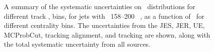 \begin{figure}
{\begin{tabular}{cc}
\end{tabular} }
   \caption{A summary of the systematic uncertainties on \RDptr\ distributions for different track \pt, bins, for jets with \pt\ 158--200  \GeV\ , as a function of \rvar\ for different centrality bins. The uncertainties from the JES, JER, UE, MCProbCut, tracking alignment, and tracking are shown, along with the total systematic uncertainty from all sources. }
      \label{fig:rdptr_sys_uncert_A1}
\end{figure}

 \begin{figure}
\end{figure}
